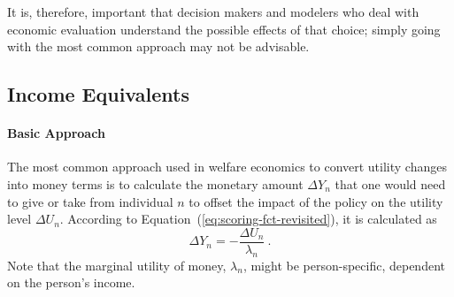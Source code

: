 %
It is, therefore, important that decision makers and modelers who deal with economic evaluation understand the possible effects of that choice; simply going with the most common approach may not be advisable.
%

\subsection{Income Equivalents}%
\label{ch:economicEval:aggregatingValues:income}%
%
\paragraph*{Basic Approach}
%
The most common approach used in welfare economics to convert utility changes into money terms is to calculate the monetary amount $\Delta Y_n$ that one would need to give or take from individual $n$ to offset the impact of the policy on the utility level $\Delta U_n$.
%
According to Equation~(\ref{eq:scoring-fct-revisited}), it is calculated as 
\begin{equation}
\Delta Y_n = - \frac{\Delta U_n}{\lambda_n} \ .
\label{eq:ch:economicEval:monetizationWtP}
\end{equation}
%
%
Note that the marginal utility of money, $\lambda_n$, might be person-specific, \eg dependent on the person's income.

